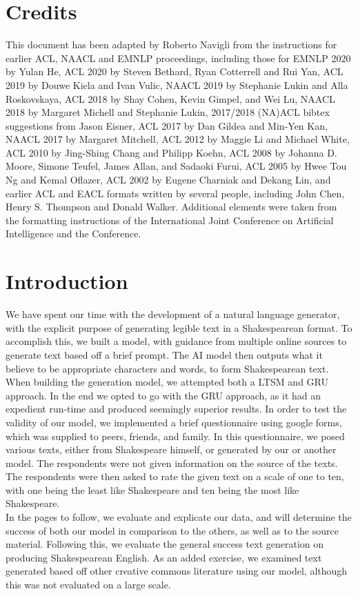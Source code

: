 \documentclass[11pt,a4paper]{article}
\begin{document}
\section{Credits}
This document has been adapted by Roberto Navigli from the instructions for earlier ACL, NAACL and EMNLP proceedings, including those for EMNLP 2020 by Yulan He, ACL 2020 by Steven Bethard, Ryan Cotterrell and Rui Yan, ACL 2019 by Douwe Kiela and Ivan Vulic, NAACL 2019 by Stephanie Lukin and Alla Roskovskaya, ACL 2018 by Shay Cohen, Kevin Gimpel, and Wei Lu, NAACL 2018 by Margaret Michell and Stephanie Lukin, 2017/2018 (NA)ACL bibtex suggestions from Jason Eisner, ACL 2017 by Dan Gildea and
Min-Yen Kan, NAACL 2017 by Margaret Mitchell, ACL 2012 by Maggie Li and Michael White, ACL 2010 by Jing-Shing Chang and Philipp Koehn, ACL 2008 by Johanna D. Moore, Simone Teufel, James Allan, and Sadaoki Furui, ACL 2005 by Hwee Tou Ng and Kemal Oflazer, ACL 2002 by Eugene Charniak and Dekang Lin, and earlier ACL and EACL formats written by several people, including John Chen, Henry S. Thompson and Donald Walker. Additional elements were taken from the formatting instructions of the International
Joint Conference on Artificial Intelligence and the Conference. 
\section{Introduction}

We have spent our time with the development of a natural language generator, with the explicit purpose of generating legible text in a Shakespearean format. To accomplish this, we built a model, with guidance from multiple online sources to generate text based off a brief prompt. The AI model then outputs what it believe to be appropriate characters and words, to form Shakespearean text. When building the generation model, we attempted both a LTSM and GRU approach. In the end we opted to go with the GRU approach, as it had an expedient run-time and produced seemingly superior results. In order to test the validity of our model, we implemented a brief questionnaire using google forms, which was supplied to peers, friends, and family. In this questionnaire, we posed various texts, either from Shakespeare himself, or generated by our or another model. The respondents were not given information on the source of the texts. The respondents were then asked to rate the given text on a scale of one to ten, with one being the least like Shakespeare and ten being the most like Shakespeare. \\
In the pages to follow, we evaluate and explicate our data, and will determine the success of both our model in comparison to the others, as well as to the source material. Following this, we evaluate the general success text generation on producing Shakespearean English. As an added exercise, we examined text generated based off other creative commons literature using our model, although this was not evaluated on a large scale.
\end{document}
